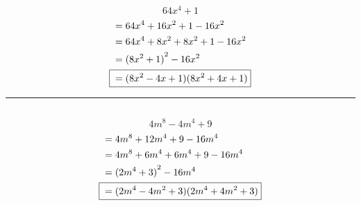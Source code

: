	\subsection{}
		\[64x^4 + 1\]
		\begin{align*}
			&= 64x^4 + 16x^2 + 1 - 16x^2 \\
			&= 64x^4 + 8x^2 + 8x^2 + 1 - 16x^2 \\
			&= {(8x^2 + 1)}^2 - 16x^2 \\
			\Aboxed{{} &= (8x^2 - 4x + 1)(8x^2 + 4x + 1)}
		\end{align*}
		\hrule{}

	\subsection{}
		\[4m^8 - 4m^4 + 9\]
		\begin{align*}
			&= 4m^8 + 12m^4 + 9 - 16m^4 \\
			&= 4m^8 + 6m^4 + 6m^4 + 9 - 16m^4 \\
			&= {(2m^4 + 3)}^2 - 16m^4 \\
			\Aboxed{{} &= (2m^4 - 4m^2 + 3)(2m^4 + 4m^2 + 3)}
		\end{align*}

	\pagebreak{}
